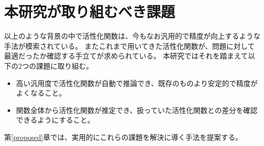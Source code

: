 \section{本研究が取り組むべき課題}
\label{kadai}

以上のような背景の中で活性化関数は、今もなお汎用的で精度が向上するような手法が模索されている。
またこれまで用いてきた活性化関数が、問題に対して最適だったか確認する手立てが求められている。
本研究ではそれを踏まえて以下の2つの課題に取り組む。

\begin{itemize}
  \item 高い汎用度で活性化関数が自動で推論でき、既存のものより安定的で精度がよくなること。
  \item 関数全体から活性化関数が推定でき、扱っていた活性化関数との差分を確認できるようにすること。
\end{itemize}

第\ref{proposed}章では、実用的にこれらの課題を解決に導く手法を提案する。



